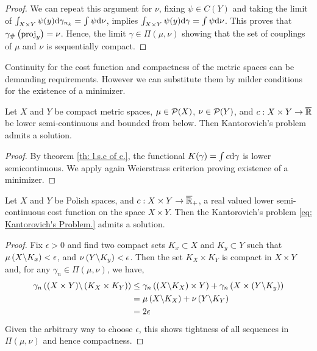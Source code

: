 \begin{theorem}
\begin{proof}
	We can repeat this argument for $\nu$, fixing $\psi \in C(Y)$ and taking the limit of $\int_{X\times Y} \psi(y) \mathrm{d} \gamma_{n_k}=\int \psi \mathrm{d}\nu$, implies $\int_{X\times Y} \psi(y) \mathrm{d} \gamma=\int \psi \mathrm{d}\nu$. This proves that ${\gamma}_{\#} \left( \mathrm{proj}_y \right)=\nu$. Hence, the limit $\gamma \in \Pi(\mu, \nu)$ showing that the set of couplings of $\mu$ and $\nu$ is sequentially compact. 
\end{proof}

Continuity for the cost function and compactness of the metric spaces can be demanding requirements. However we can substitute them by milder conditions for the existence of a minimizer. 

\begin{theorem}
	Let $X$ and $Y$ be compact metric spaces, $\mu \in \mathcal{P}(X)$, $\nu \in\mathcal{P}(Y)$, and $c:X\times Y\rightarrow \overline{\mathbb{R}} $  be lower semi-continuous and bounded from below. Then Kantorovich's problem admits a solution.
\end{theorem}

\begin{proof}
By theorem \ref{th: l.s.c of c.}, the functional $K(\gamma) =\int c\mathrm{d}\gamma$ is lower semicontinuous. We apply again Weierstrass criterion proving existence of a minimizer.
\end{proof}

\begin{theorem}
Let $X$ and $Y$ be Polish spaces, and $c:X\times Y \rightarrow \overline{\mathbb{R}}_+$, a real valued lower semi-continuous cost function on the space $X\times Y$. Then the Kantorovich's problem \eqref{eq: Kantorovich's Problem.} admits a solution.
\end{theorem}

\begin{proof}
Fix $\epsilon>0$ and find two compact sets $K_x\subset X$ and $K_y\subset Y$ such that $\mu\left( X\backslash K_x \right)<\epsilon$, and $\nu\left( Y\backslash K_y \right)<\epsilon$. Then the set $K_X\times K_Y$ is compact in $X\times Y$ and, for any $\gamma_n\in \Pi(\mu, \nu)$, we have,
\begin{align*}
	\gamma_n\left( (X\times Y)\backslash \left( K_X\times K_Y \right) \right)&\leq \gamma_n\left( (X\backslash K_X)\times Y \right)+\gamma_n\left( X\times \left( Y\backslash K_y \right) \right)\\&=\mu\left( X\backslash K_X \right)+\nu\left( Y\backslash K_Y \right)\\&=2\epsilon
\end{align*}  
Given the arbitrary way to choose $\epsilon$, this shows tightness of all sequences in $\Pi(\mu, \nu)$ and hence compactness.
\end{proof}



\end{theorem}
